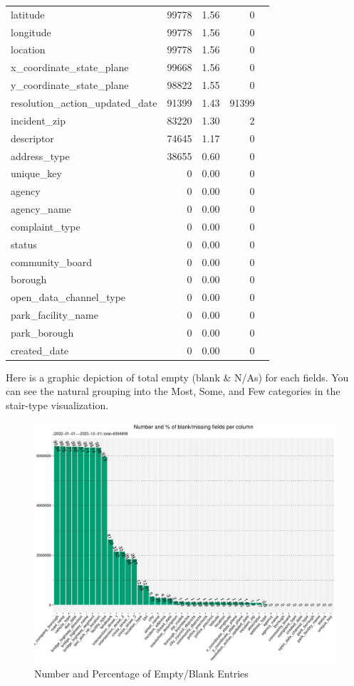 \documentclass[12pt, titlepage]{article}
\begin{document}
\begin{table}[tbp]
{\begin{tabular}{lrrrl}
			latitude & 99778 & 1.56 & 0 \\
			longitude & 99778 & 1.56 & 0 \\
			location & 99778 & 1.56 & 0 \\
			x\_coordinate\_state\_plane & 99668 & 1.56 & 0 \\
			y\_coordinate\_state\_plane & 98822 & 1.55 & 0 \\
			resolution\_action\_updated\_date & 91399 & 1.43 & 91399 \\
			incident\_zip & 83220 & 1.30 & 2 \\
			descriptor & 74645 & 1.17 & 0 \\
			address\_type & 38655 & 0.60 & 0 \\
			unique\_key & 0 & 0.00 & 0 \\
			agency & 0 & 0.00 & 0 \\
			agency\_name & 0 & 0.00 & 0 \\
			complaint\_type & 0 & 0.00 & 0 \\
			status & 0 & 0.00 & 0 \\
			community\_board & 0 & 0.00 & 0 \\
			borough & 0 & 0.00 & 0 \\
			open\_data\_channel\_type & 0 & 0.00 & 0 \\
			park\_facility\_name & 0 & 0.00 & 0 \\
			park\_borough & 0 & 0.00 & 0 \\
			created\_date & 0 & 0.00 & 0 \\
		\bottomrule
	\end{tabular}
}
\end{table}

Here is a graphic depiction of total empty (blank \& N/As) for each fields. 
You can see the natural grouping into the Most, Some, and Few categories 
in the stair-type visualization. 

\begin{figure}[tbp]
	\centering
  	\includegraphics[width=\textwidth]{BlankFields.pdf}
	\caption{Number and Percentage of Empty/Blank Entries}
	\label{fig:blank_fields}
\end{figure}
\end{document}
